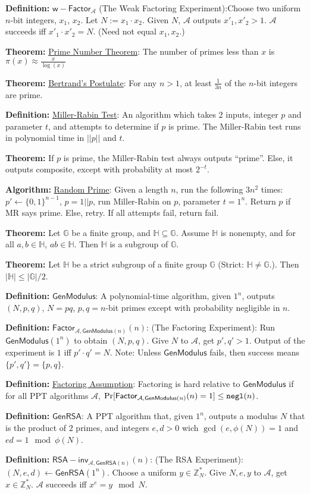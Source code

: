 \documentclass[10pt]{article}
\newcommand{\Z}{\mathbb{Z}}
\newcommand{\G}{\mathbb{G}}
\newcommand{\HH}{\mathbb{H}}
\newcommand{\AAA}{\mathcal{A}}
\newcommand{\defn}[1]{{\bf Definition:} \underline{#1}}
\newcommand{\thm}[1]{{\bf Theorem:} \underline{#1}}
\newcommand{\alg}[1]{{\bf Algorithm:} \underline{#1}}
\newcommand{\GenM}{\mathsf{GenModulus}}
\newcommand{\GenRSA}{\mathsf{GenRSA}}
\newcommand{\ExptFacArgs}[2]{\mathsf{Factor}_{#1,#2}}
\newcommand{\ExptRSAArgs}[2]{\mathsf{RSA-inv}_{#1,#2}}
\newcommand{\ExptWFacArgs}[1]{\mathsf{w-Factor}_{#1}}
\newcommand{\ExptFac}{\ExptFacArgs{\AAA}{\GenM(n)}}
\newcommand{\ExptRSA}{\ExptRSAArgs{\AAA}{\GenRSA(n)}}
\newcommand{\ExptWFac}{\ExptWFacArgs{\AAA}}
\newcommand{\negl}{{\tt negl}}
\newcommand{\from}{\leftarrow}
\begin{document}
\scriptsize
\begin{multicols}{3}

\defn{$\ExptWFac$} (The Weak Factoring Experiment):Choose two uniform $n$-bit integers, $x_1$, $x_2$. Let $N:=x_1\cdot x_2$. Given $N$, $\AAA$ outputs $x'_1,x'_2>1$. $\AAA$ succeeds iff $x'_1\cdot x'_2=N$. (Need not equal $x_1,x_2$.)

\thm{Prime Number Theorem}: The number of primes less than $x$ is $\pi(x)\approx\frac{x}{\log(x)}$

\thm{Bertrand's Postulate}: For any $n>1$, at least $\frac{1}{3n}$ of the $n$-bit integers are prime.

\defn{Miller-Rabin Test}: An algorithm which takes 2 inputs, integer $p$ and parameter $t$, and attempts to determine if $p$ is prime. The Miller-Rabin test runs in polynomial time in $||p||$ and $t$.

\thm{}If $p$ is prime, the Miller-Rabin test always outputs ``prime''. Else, it outputs composite, except with probability at most $2^{-t}$.

\alg{Random Prime}: Given a length $n$, run the following $3n^2$ times: $p'\from\{0,1\}^{n-1}$, $p=1||p$, run Miller-Rabin on $p$, parameter $t=1^n$. Return $p$ if MR says prime. Else, retry. If all attempts fail, return fail.

\thm{}Let $\G$ be a finite group, and $\HH\subseteq\G$. Assume $\HH$ is nonempty, and for all $a,b\in\HH$, $ab\in\HH$. Then $\HH$ is a subgroup of $\G$.

\thm{}Let $\HH$ be a strict subgroup of a finite group $\G$ (Strict: $\HH\neq \G$.). Then $|\HH|\leq|\G|/2$.

\defn{$\GenM$}: A polynomial-time algorithm, given $1^n$, outputs $(N,p,q)$, $N=pq$, $p,q=n$-bit primes except with probability negligible in $n$.

\defn{$\ExptFac(n)$}: (The Factoring Experiment): Run $\GenM(1^n)$ to obtain $(N,p,q)$. Give $N$ to $\AAA$, get $p',q'>1$. Output of the experiment is $1$ iff $p'\cdot q'=N$. Note: Unless $\GenM$ fails, then success means $\{p',q'\}=\{p,q\}$.

\defn{Factoring Assumption}: Factoring is hard relative to $\GenM$ if for all PPT algorithms $\AAA$, $\Pr[\ExptFac(n)=1]\leq\negl(n)$.

\defn{$\GenRSA$}: A PPT algorithm that, given $1^n$, outputs a modulus $N$ that is the product of $2$ primes, and integers $e,d>0$ wich $\gcd(e,\phi(N))=1$ and $ed=1\mod{\phi(N)}$.

\defn{$\ExptRSA(n)$}: (The RSA Experiment): $(N,e,d)\from\GenRSA(1^n)$. Choose a uniform $y\in\Z^*_N$. Give $N,e,y$ to $\AAA$, get $x\in\Z^*_N$. $\AAA$ succeeds iff $x^e=y\mod{N}$.


\end{multicols}
\end{document}
